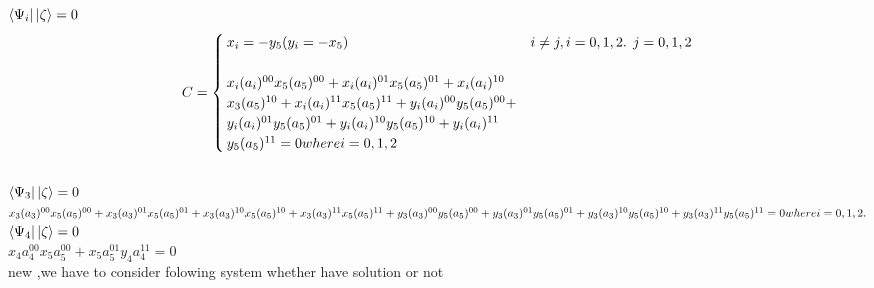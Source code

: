 \documentclass[a4paper,12pt]{article}
\begin{document}
\leavevmode
\newline \\

$\bra{\Psi_{i}}\ket{\zeta}=0 $ 
\begin{equation}
C = \begin{cases}
x_{i}=-y_{5}    (  y_{i}=-x_{5})        &  i\neq j   ,i=0,1,2 $. $ j=0,1,2\\
\newline \\

x_{i}(a_{i})^{00}x_{5}(a_{5})^{00}+x_{i}(a_{i})^{01}x_{5}(a_{5})^{01}+x_{i}(a_{i})^{10}\\
x_{3}(a_{5})^{10}+x_{i}(a_{i})^{11}x_{5}(a_{5})^{11}+y_{i}(a_{i})^{00}y_{5}(a_{5})^{00}+\\
y_{i}(a_{i})^{01}y_{5}(a_{5})^{01}+y_{i}(a_{i})^{10}y_{5}(a_{5})^{10}+y_{i}(a_{i})^{11}\\
y_{5}(a_{5})^{11}=0  where i=0,1,2
\end{cases}
\end{equation}
\newline \\
$\bra{\Psi_{3}}\ket{\zeta}=0 $
\newline \\
$x_{3}(a_{3})^{00}x_{5}(a_{5})^{00}+x_{3}(a_{3})^{01}x_{5}(a_{5})^{01}+x_{3}(a_{3})^{10}\\
x_{5}(a_{5})^{10}+x_{3}(a_{3})^{11}x_{5}(a_{5})^{11}+y_{3}(a_{3})^{00}y_{5}(a_{5})^{00}+\\
y_{3}(a_{3})^{01}y_{5}(a_{5})^{01}+y_{3}(a_{3})^{10}y_{5}(a_{5})^{10}+y_{3}(a_{3})^{11}\\
y_{5}(a_{5})^{11}=0 \newline 
 where i=0,1,2.$
 \newline \\
 $\bra{\Psi_{4}}\ket{\zeta}=0 $
 \newline \\
 $x_{4}a_{4}^{00}x_{5}a_{5}^{00}+x_{5}a_{5}^{01}y_{4}a_{4}^{11}=0$
 \leavevmode
 \newline \\
 new ,we have to consider folowing system whether have solution or not 
\end{document}
